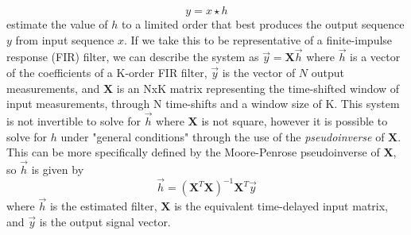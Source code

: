 \documentclass[letterpaper, 10 pt, conference]{ieeeconf}  %
\begin{document}
\begin{equation}
    \label{eq:firLinSys}
    y = x \star h
\end{equation}
estimate the value of $h$ to a limited order that best produces the output sequence $y$ from input sequence $x$. If we take this to be representative of a finite-impulse response (FIR) filter, we can describe the system as $\vec{y} = \boldsymbol{X}\vec{h}$ where $\vec{h}$ is a vector of the coefficients of a K-order FIR filter, $\vec{y}$ is the vector of $N$ output measurements, and $\boldsymbol{X}$ is an NxK matrix representing the time-shifted window of input measurements, through N time-shifts and a window size of K. This system is not invertible to solve for $\vec{h}$ where $\boldsymbol{X}$ is not square, however it is possible to solve for $h$ under "general conditions" through the use of the \emph{pseudoinverse} of $\boldsymbol{X}$. This can be more specifically defined by the Moore-Penrose pseudoinverse of $\boldsymbol{X}$, so $\vec{h}$ is given by
\begin{equation}
    \label{eq:estFilter}
    \vec{h} = (\boldsymbol{X}^{T}\boldsymbol{X})^{-1}\boldsymbol{X}^{T}\vec{y}
\end{equation}
where $\vec{h}$ is the estimated filter, $\boldsymbol{X}$ is the equivalent time-delayed input matrix, and $\vec{y}$ is the output signal vector.
\end{document}

